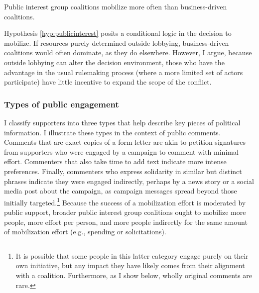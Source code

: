 \begin{subhyp}
\begin{hyp} \label{hyp:publicinterest}
Public interest group coalitions mobilize more often than business-driven coalitions.
\end{hyp}

Hypothesis \ref{hyp:publicinterest} posits a conditional logic in the decision to mobilize. If resources purely determined outside lobbying, business-driven coalitions would often dominate, as they do elsewhere. However, I argue, because outside lobbying can alter the decision environment, those who have the advantage in the usual rulemaking process (where a more limited set of actors participate) have little incentive to expand the scope of the conflict.








\subsubsection{Types of public engagement} I classify supporters into three types that help describe key pieces of political information. I illustrate these types in the context of public comments. Comments that are exact copies of a form letter are akin to petition signatures from supporters who were engaged by a campaign to comment with minimal effort. Commenters that also take time to add text indicate more intense preferences. Finally, commenters who express solidarity in similar but distinct phrases indicate they were engaged indirectly, perhaps by a news story or a social media post about the campaign, as campaign messages spread beyond those initially targeted.\footnote{It is possible that some people in this latter category engage purely on their own initiative, but any impact they have likely comes from their alignment with a coalition. Furthermore, as I show below, wholly original comments are rare.} Because the success of a mobilization effort is moderated by public support, broader public interest group coalitions ought to mobilize more people, more effort per person, and more people indirectly for the same amount of mobilization effort (e.g., spending or solicitations).  


\end{subhyp}
